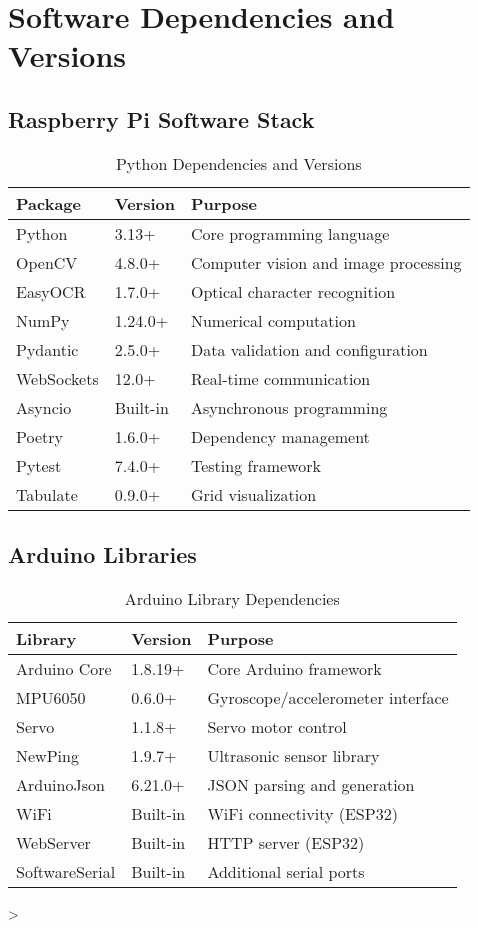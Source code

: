 \section{Software Dependencies and Versions}

\subsection{Raspberry Pi Software Stack}

\begin{table}[H]
\centering
\caption{Python Dependencies and Versions}
\begin{tabular}{|l|l|l|}
\hline
\textbf{Package} & \textbf{Version} & \textbf{Purpose} \\
\hline
Python & 3.13+ & Core programming language \\
OpenCV & 4.8.0+ & Computer vision and image processing \\
EasyOCR & 1.7.0+ & Optical character recognition \\
NumPy & 1.24.0+ & Numerical computation \\
Pydantic & 2.5.0+ & Data validation and configuration \\
WebSockets & 12.0+ & Real-time communication \\
Asyncio & Built-in & Asynchronous programming \\
Poetry & 1.6.0+ & Dependency management \\
Pytest & 7.4.0+ & Testing framework \\
Tabulate & 0.9.0+ & Grid visualization \\
\hline
\end{tabular}
\label{tab:python_deps}
\end{table}

\subsection{Arduino Libraries}

\begin{table}[H]
\centering
\caption{Arduino Library Dependencies}
\begin{tabular}{|l|l|l|}
\hline
\textbf{Library} & \textbf{Version} & \textbf{Purpose} \\
\hline
Arduino Core & 1.8.19+ & Core Arduino framework \\
MPU6050 & 0.6.0+ & Gyroscope/accelerometer interface \\
Servo & 1.1.8+ & Servo motor control \\
NewPing & 1.9.7+ & Ultrasonic sensor library \\
ArduinoJson & 6.21.0+ & JSON parsing and generation \\
WiFi & Built-in & WiFi connectivity (ESP32) \\
WebServer & Built-in & HTTP server (ESP32) \\
SoftwareSerial & Built-in & Additional serial ports \\
\hline
\end{tabular}
\label{tab:arduino_libs}
\end{table}>

